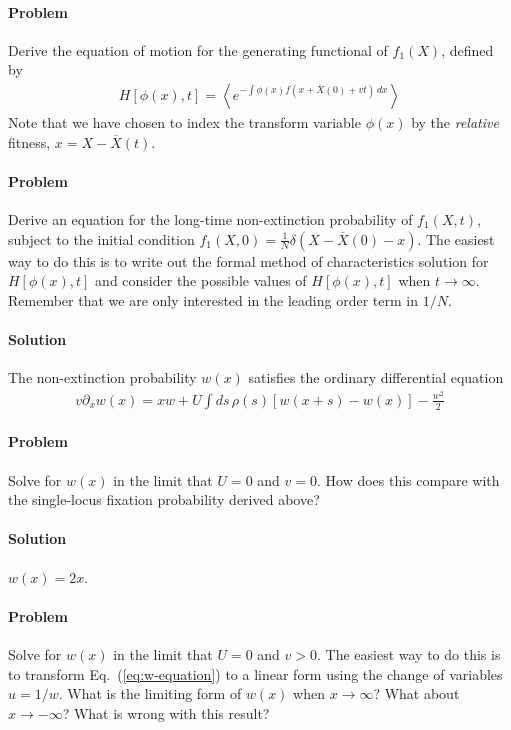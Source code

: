 \documentclass[11pt]{article}
\newcommand{\eq}[1]{Eq.~(\ref{#1})}
\begin{document}
\paragraph{Problem} Derive the equation of motion for the generating functional of $f_1(X)$, defined by
\begin{align}
H[\phi(x),t] = \left\langle e^{-\int \phi(x) f(x+\overline{X}(0)+vt) \, dx } \right\rangle
\end{align}
Note that we have chosen to index the transform variable $\phi(x)$ by the \emph{relative} fitness, $x = X-\overline{X}(t)$. 

\paragraph{Problem} Derive an equation for the long-time non-extinction probability of $f_1(X,t)$, subject to the initial condition $f_1(X,0) = \frac{1}{N} \delta(X-\overline{X}(0)-x)$. The easiest way to do this is to write out the formal method of characteristics solution for $H[\phi(x),t]$ and consider the possible values of $H[\phi(x),t]$ when $t \to \infty$. Remember that we are only interested in the leading order term in $1/N$.    

\paragraph{Solution} The non-extinction probability $w(x)$ satisfies the ordinary differential equation 
\begin{align}
\label{eq:w-equation}
v \partial_x w(x) = x w + U \int ds \, \rho(s) \left[ w(x+s) - w(x) \right] - \frac{w^2}{2} 
\end{align}

\paragraph{Problem} Solve for $w(x)$ in the limit that $U=0$ and $v=0$. How does this compare with the single-locus fixation probability derived above? 

\paragraph{Solution} $w(x) = 2x$. 

\paragraph{Problem} Solve for $w(x)$ in the limit that $U=0$ and $v>0$. The easiest way to do this is to transform \eq{eq:w-equation} to a linear form using the change of variables $u=1/w$. What is the limiting form of $w(x)$ when $x \to \infty$? What about $x \to -\infty$? What is wrong with this result?
\end{document}
